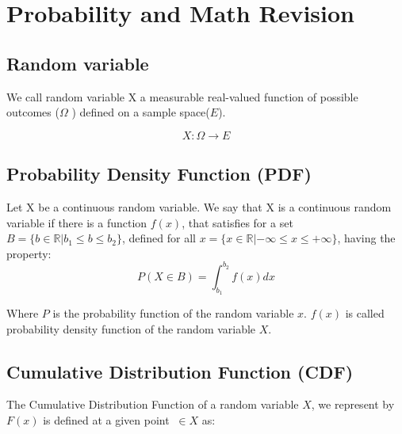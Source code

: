 \chapter{Probability and Math Revision}
\label{ap:revision-probability}


\section{Random variable}
We call random variable X a measurable real-valued  function of possible outcomes ($\Omega$ ) defined on a sample space($E$).

\begin{equation}
	X: \Omega \rightarrow E
\end{equation}


\section{Probability Density Function (PDF)}

Let X be a continuous random variable. We say that X is a continuous random variable if there is a function $f (x) $, that satisfies for a set $B = \{b \in \mathbb{R} | b_ {1} \leq b \leq b_ {2}\} $, defined for all $x = \{x \in \mathbb{R}| - \infty \leq x \leq + \infty\} $, having the property: 
\begin{equation}
	P(X \in B) = \int_{b_{1}}^{b_{2}}f(x) dx 
\end{equation}

Where $P$ is the probability function of the random variable $x$. $f(x)$ is called probability density function of the random variable $X$\cite{ross-probability}. 


\section{Cumulative Distribution Function (CDF)}

The Cumulative Distribution Function of a random variable $X$, we represent by $F (x) $ is defined at a given point $\ \in X$ as\cite{ross-probability}: 


